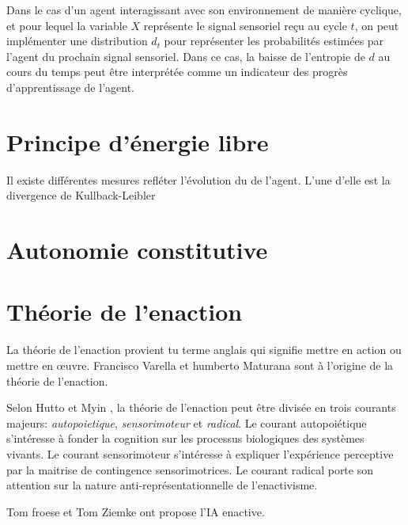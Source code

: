 Dans le cas d'un agent interagissant avec son environnement de manière cyclique, et pour lequel la variable $X$ représente le signal sensoriel reçu au cycle $t$, on peut implémenter une distribution $d_t$ pour représenter les probabilités estimées par l'agent du prochain signal sensoriel. 
Dans ce cas, la baisse de l'entropie de $d$ au cours du temps peut être interprétée comme un indicateur des progrès d'apprentissage de l'agent. 


\section{Principe d'énergie libre}

Il existe différentes mesures refléter l'évolution du  de l'agent. 
L'une d'elle est la divergence de Kullback-Leibler



\section{Autonomie constitutive}



\section{Théorie de l'enaction}
\label{sec:enaction}

La théorie de l'enaction provient tu terme anglais  qui signifie mettre en action ou mettre en œuvre. 
Francisco Varella et humberto Maturana \cite{varela_embodied_1993} sont à l'origine de la théorie de l'enaction.



Selon Hutto et Myin \cite{hutto_radicalizing_2013}, la théorie de l'enaction peut être divisée en trois courants majeurs: \emph{autopoietique}, \emph{sensorimoteur} et \emph{radical}. 
Le courant autopoiétique \cite{varela_embodied_1993} s'intéresse à fonder la cognition sur les processus biologiques des systèmes vivants. 
Le courant sensorimoteur \cite{oregan_sensorimotor_2001} s'intéresse à expliquer l'expérience perceptive par la maitrise de contingence sensorimotrices. 
Le courant radical \cite{hutto_radicalizing_2013} porte son attention sur la nature anti-représentationnelle de l'enactivisme. 
 

Tom froese et Tom Ziemke ont propose l'IA enactive. 
\cite{froese_enactive_2009}

